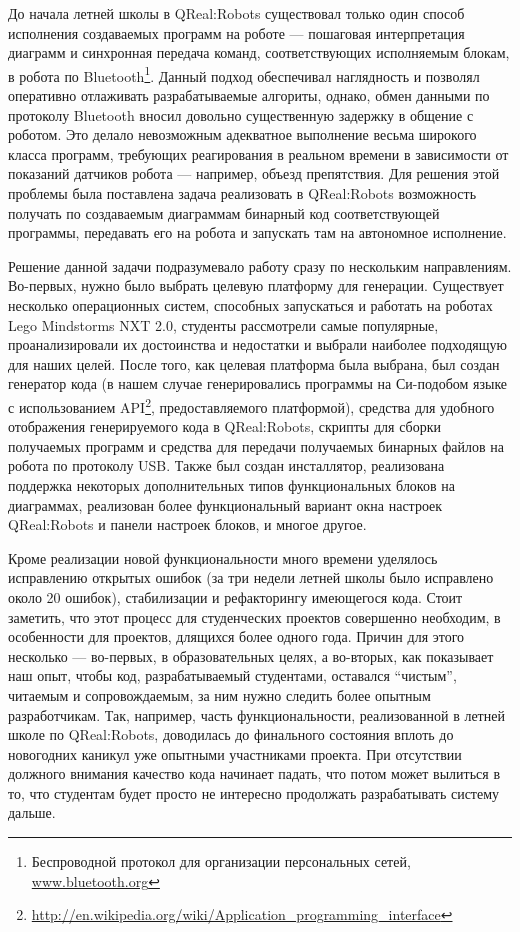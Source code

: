 \documentclass[a4paper]{article}
\begin{document}
До начала летней школы в QReal:Robots существовал только один способ исполнения создаваемых программ на роботе --- пошаговая интерпретация диаграмм и синхронная передача команд, соответствующих исполняемым блокам, в робота по Bluetooth\footnote{Беспроводной протокол для организации персональных сетей, \url{www.bluetooth.org}}. Данный подход обеспечивал наглядность и позволял оперативно отлаживать разрабатываемые алгориты, однако, обмен данными по протоколу Bluetooth вносил довольно существенную задержку в общение с роботом. Это делало невозможным адекватное выполнение весьма широкого класса программ, требующих реагирования в реальном времени в зависимости от показаний датчиков робота --- например, объезд препятствия. Для решения этой проблемы была поставлена задача реализовать в QReal:Robots возможность получать по создаваемым диаграммам бинарный код соответствующей программы, передавать его на робота и запускать там на автономное исполнение.

Решение данной задачи подразумевало работу сразу по нескольким направлениям. Во-первых, нужно было выбрать целевую платформу для генерации. Существует несколько операционных систем, способных запускаться и работать на роботах Lego Mindstorms NXT 2.0, студенты рассмотрели самые популярные, проанализировали их достоинства и недостатки и выбрали наиболее подходящую для наших целей. После того, как целевая платформа была выбрана, был создан генератор кода (в нашем случае генерировались программы на Си-подобом языке с использованием API\footnote{\url{http://en.wikipedia.org/wiki/Application_programming_interface}}, предоставляемого платформой), средства для удобного отображения генерируемого кода в QReal:Robots, скрипты для сборки получаемых программ и средства для передачи получаемых бинарных файлов на робота по протоколу USB. Также был создан инсталлятор, реализована поддержка некоторых дополнительных типов функциональных блоков на диаграммах, реализован более функциональный вариант окна настроек QReal:Robots и панели настроек блоков,  и многое другое.

Кроме реализации новой функциональности много времени уделялось исправлению открытых ошибок (за три недели летней школы было исправлено около 20 ошибок), стабилизации и рефакторингу имеющегося кода. Стоит заметить, что этот процесс для студенческих проектов совершенно необходим, в особенности для проектов, длящихся более одного года. Причин для этого несколько --- во-первых, в образовательных целях, а во-вторых, как показывает наш опыт, чтобы код, разрабатываемый студентами, оставался ``чистым'', читаемым и сопровождаемым, за ним нужно следить более опытным разработчикам. Так, например, часть функциональности, реализованной в летней школе по QReal:Robots, доводилась до финального состояния вплоть до новогодних каникул уже опытными участниками проекта. При отсутствии должного внимания качество кода начинает падать, что потом может вылиться в то, что студентам будет просто не интересно продолжать разрабатывать систему дальше.
\end{document}
